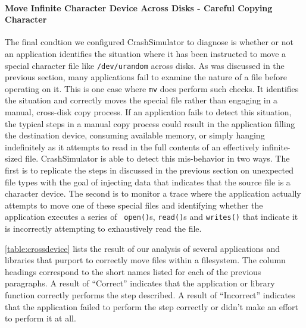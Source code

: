 \paragraph{Move Infinite Character Device Across Disks - Careful Copying Character}

The final condtion we configured CrashSimulator to diagnose is whether or not an
application identifies the situation where it has been instructed to move a
special character file like {\tt /dev/urandom} across disks.  As was discussed
in the previous section, many applications fail to examine the nature of a file
before operating on it.  This is one case where {\tt mv} does perform such
checks.  It identifies the situation and correctly moves the special file rather
than engaging in a manual, cross-disk copy process.  If an application fails to
detect this situation, the typical steps in a manual copy process could result
in the application filling the destination device, consuming available memory,
or simply hanging indefinitely as it attempts to read in the full contents of an
effectively infinite-sized file.  CrashSimulator is able to detect this
mis-behavior in two ways.  The first is to replicate the steps in discussed in
the previous section on unexpected file types with the goal of injecting data
that indicates that the source file is a character device.  The second is to
monitor a trace where the application actually attempts to move one of these
special files and identifying whether the application executes a series of {\tt
  open()}s, {\tt read()}s and {\tt writes()} that indicate it is incorrectly
attempting to exhaustively read the file.

\ref{table:crossdevice} lists the result of our analysis of several applications
and libraries that purport to correctly move files within a filesystem.  The
column headings correspond to the short names listed for each of the previous
paragraphs. A result of ``Correct'' indicates that the application or library
function correctly performs the step described.  A result of ``Incorrect''
indicates that the application failed to perform the step correctly or didn't
make an effort to perform it at all.


